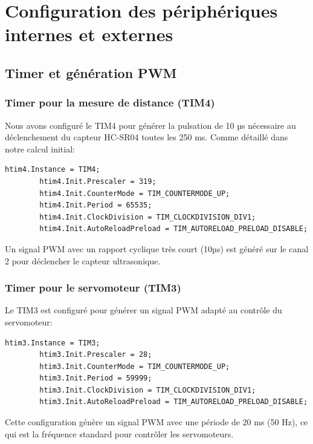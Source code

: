 \section{Configuration des périphériques internes et externes}

\subsection{Timer et génération PWM}

    \subsubsection{Timer pour la mesure de distance (TIM4)}
        Nous avons configuré le TIM4 pour générer la pulsation de 10 µs nécessaire au déclenchement du capteur HC-SR04 toutes les 250 ms. Comme détaillé dans notre calcul initial:

        \begin{lstlisting}[caption={Configuration du TIM4}, label={lst:tim4config}]
        htim4.Instance = TIM4;
        htim4.Init.Prescaler = 319;
        htim4.Init.CounterMode = TIM_COUNTERMODE_UP;
        htim4.Init.Period = 65535;
        htim4.Init.ClockDivision = TIM_CLOCKDIVISION_DIV1;
        htim4.Init.AutoReloadPreload = TIM_AUTORELOAD_PRELOAD_DISABLE;
        \end{lstlisting}

        Un signal PWM avec un rapport cyclique très court (10µs) est généré sur le canal 2 pour déclencher le capteur ultrasonique.

    \subsubsection{Timer pour le servomoteur (TIM3)}
        Le TIM3 est configuré pour générer un signal PWM adapté au contrôle du servomoteur:

        \begin{lstlisting}[caption={Configuration du TIM3}, label={lst:tim3config}]
        htim3.Instance = TIM3;
        htim3.Init.Prescaler = 28;
        htim3.Init.CounterMode = TIM_COUNTERMODE_UP;
        htim3.Init.Period = 59999;
        htim3.Init.ClockDivision = TIM_CLOCKDIVISION_DIV1;
        htim3.Init.AutoReloadPreload = TIM_AUTORELOAD_PRELOAD_DISABLE;
        \end{lstlisting}

        Cette configuration génère un signal PWM avec une période de 20 ms (50 Hz), ce qui est la fréquence standard pour contrôler les servomoteurs.

